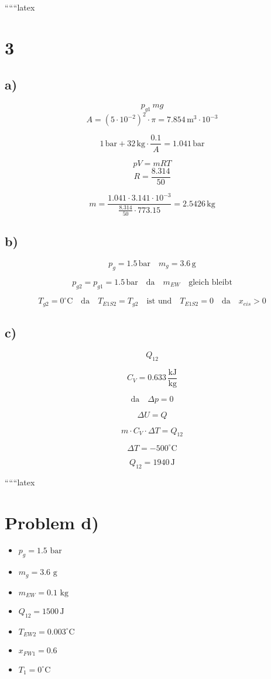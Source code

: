 
``````latex


\section*{3}

\subsection*{a)}
\[ p_{g1} \, mg \]
\[ A = (5 \cdot 10^{-2})^2 \cdot \pi = 7.854 \, \text{m}^3 \cdot 10^{-3} \]

\[ 1 \, \text{bar} + 32 \, \text{kg} \cdot \frac{0.1}{A} = 1.041 \, \text{bar} \]

\[ pV = mRT \]
\[ R = \frac{8.314}{50} \]

\[ m = \frac{1.041 \cdot 3.141 \cdot 10^{-3}}{\frac{8.314}{50} \cdot 773.15} = 2.5426 \, \text{kg} \]

\subsection*{b)}
\[ p_{g} = 1.5 \, \text{bar} \quad m_{g} = 3.6 \, \text{g} \]

\[ p_{g2} = p_{g1} = 1.5 \, \text{bar} \quad \text{da} \quad m_{EW} \quad \text{gleich bleibt} \]

\[ T_{g2} = 0^\circ \text{C} \quad \text{da} \quad T_{E1S2} = T_{g2} \quad \text{ist und} \quad T_{E1S2} = 0 \quad \text{da} \quad x_{eis} > 0 \]

\subsection*{c)}
\[ Q_{12} \]

\[ C_V = 0.633 \, \frac{\text{kJ}}{\text{kg}} \]

\[ \text{da} \quad \Delta p = 0 \]

\[ \Delta U = Q \]

\[ m \cdot C_V \cdot \Delta T = Q_{12} \]

\[ \Delta T = -500^\circ \text{C} \]

\[ Q_{12} = 1940 \, \text{J} \]

``````latex

\section*{Problem d)}

\begin{itemize}
    \item $p_{g} = 1.5 \text{ bar}$
    \item $m_{g} = 3.6 \text{ g}$
    \item $m_{EW} = 0.1 \text{ kg}$
    \item $Q_{12} = 1500 \, \text{J}$
    \item $T_{EW2} = 0.003^\circ \text{C}$
    \item $x_{FW1} = 0.6$
    \item $T_1 = 0^\circ \text{C}$
\end{itemize}

